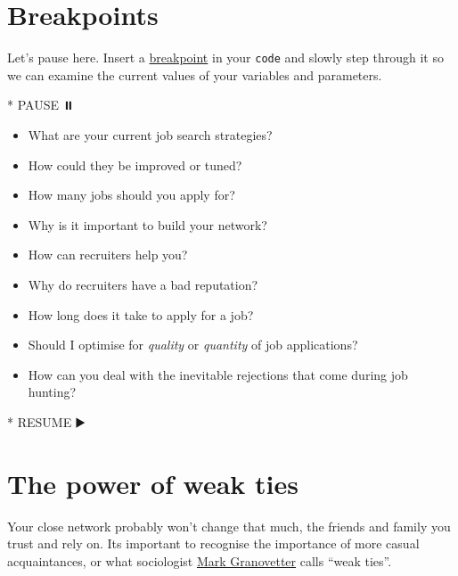 \documentclass[
]{book}
\newenvironment{Shaded}{\begin{snugshade}}{\end{snugshade}}
\newcommand{\NormalTok}[1]{#1}
\newcommand{\SpecialStringTok}[1]{\textcolor[rgb]{0.31,0.60,0.02}{#1}}
\providecommand{\tightlist}{%
  \setlength{\itemsep}{0pt}\setlength{\parskip}{0pt}}
\begin{document}
\hypertarget{bp8}{%
\section{Breakpoints}\label{bp8}}

Let's pause here. Insert a \href{https://en.wikipedia.org/wiki/Breakpoint}{breakpoint} in your \texttt{code} and slowly step through it so we can examine the current values of your variables and parameters.

\begin{Shaded}
\begin{Highlighting}[]
\SpecialStringTok{* }\NormalTok{PAUSE ⏸️}
\end{Highlighting}
\end{Shaded}

\begin{itemize}
\tightlist
\item
  What are your current job search strategies?
\item
  How could they be improved or tuned?
\item
  How many jobs should you apply for?\\
\item
  Why is it important to build your network?
\item
  How can recruiters help you?
\item
  Why do recruiters have a bad reputation?
\item
  How long does it take to apply for a job?
\item
  Should I optimise for \emph{quality} or \emph{quantity} of job applications?
\item
  How can you deal with the inevitable rejections that come during job hunting?
\end{itemize}

\begin{Shaded}
\begin{Highlighting}[]
\SpecialStringTok{* }\NormalTok{RESUME ▶️}
\end{Highlighting}
\end{Shaded}

\hypertarget{weakties}{%
\section{The power of weak ties}\label{weakties}}

Your close network probably won't change that much, the friends and family you trust and rely on. Its important to recognise the importance of more casual acquaintances, or what sociologist \href{https://en.wikipedia.org/wiki/Mark_Granovetter}{Mark Granovetter} calls ``weak ties''. \citep{granovetter}
\end{document}
